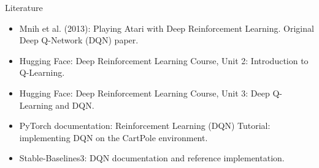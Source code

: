 \documentclass{beamer}
\begin{document}
\begin{frame}{Literature}
	\begin{itemize}
		
		\item Mnih et al. (2013):
		{Playing Atari with Deep Reinforcement Learning. Original Deep Q-Network (DQN) paper.}
		
		\item Hugging Face:
		{Deep Reinforcement Learning Course, Unit 2: Introduction to Q-Learning.}
		
		\item Hugging Face:
		{Deep Reinforcement Learning Course, Unit 3: Deep Q-Learning and DQN.}
		
		\item PyTorch documentation:
		{Reinforcement Learning (DQN) Tutorial: implementing DQN on the CartPole environment.}
		
		\item Stable-Baselines3:
		{DQN documentation and reference implementation.}
		
	\end{itemize}
\end{frame}


\myqrframe
\end{document}
